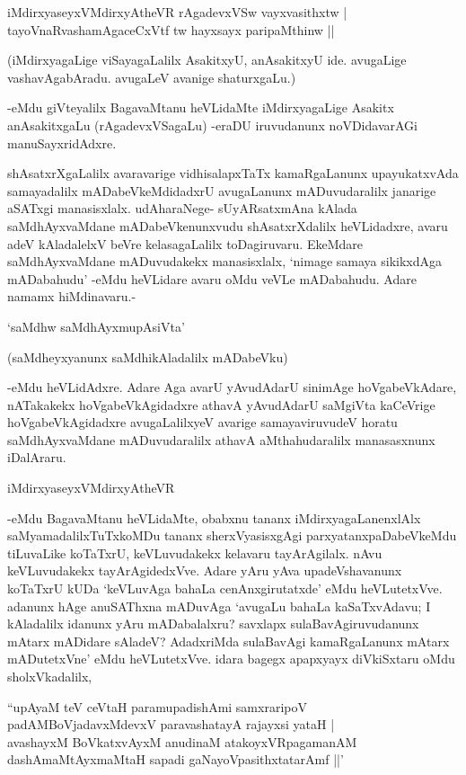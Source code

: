 \begin{shloka}
iMdirxyaseyxVMdirxyAtheVR rAgadevxVSw vayxvasithxtw |\\
tayoVnaRvashamAgaceCxVtf tw hayxsayx paripaMthinw ||
\end{shloka}

(iMdirxyagaLige viSayagaLalilx AsakitxyU, anAsakitxyU ide. avugaLige vashavAgabAradu. avugaLeV avanige shaturxgaLu.)

-eMdu giVteyalilx BagavaMtanu heVLidaMte iMdirxyagaLige Asakitx anAsakitxgaLu (rAgadevxVSagaLu) -eraDU iruvudanunx noVDidavarAGi manuSayxridAdxre.

shAsatxrXgaLalilx avaravarige vidhisalapxTaTx kamaRgaLanunx upayukatxvAda samayadalilx mADabeVkeMdidadxrU avugaLanunx mADuvudaralilx janarige aSATxgi manasisxlalx. udAharaNege- sUyARsatxmAna kAlada saMdhAyxvaMdane mADabeVkenunxvudu shAsatxrXdalilx heVLidadxre, avaru adeV kAladalelxV beVre kelasagaLalilx toDagiruvaru. EkeMdare saMdhAyxvaMdane mADuvudakekx manasisxlalx, `nimage samaya sikikxdAga mADabahudu' -eMdu heVLidare avaru oMdu veVLe mADabahudu. Adare namamx hiMdinavaru.-

\begin{shloka}
`saMdhw saMdhAyxmupAsiVta'
\end{shloka}

(saMdheyxyanunx saMdhikAladalilx mADabeVku)

-eMdu heVLidAdxre. Adare Aga avarU yAvudAdarU sinimAge hoVgabeVkAdare, nATakakekx hoVgabeVkAgidadxre athavA yAvudAdarU saMgiVta kaCeVrige hoVgabeVkAgidadxre avugaLalilxyeV avarige samayaviruvudeV horatu saMdhAyxvaMdane mADuvudaralilx athavA aMthahudaralilx manasasxnunx iDalAraru.

\begin{shloka}
iMdirxyaseyxVMdirxyAtheVR
\end{shloka}

-eMdu BagavaMtanu heVLidaMte, obabxnu tananx iMdirxyagaLanenxlAlx saMyamadalilxTuTxkoMDu tananx sherxVyasisxgAgi parxyatanxpaDabeVkeMdu tiLuvaLike koTaTxrU, keVLuvudakekx kelavaru tayArAgilalx. nAvu keVLuvudakekx tayArAgidedxVve. Adare yAru yAva upadeVshavanunx koTaTxrU kUDa `keVLuvAga bahaLa cenAnxgirutatxde' eMdu heVLutetxVve. adanunx hAge anuSAThxna mADuvAga `avugaLu bahaLa kaSaTxvAdavu; I kAladalilx idanunx yAru mADabalalxru? savxlapx sulaBavAgiruvudanunx mAtarx mADidare sAladeV? AdadxriMda sulaBavAgi kamaRgaLanunx mAtarx mADutetxVne' eMdu heVLutetxVve. idara bagegx apapxyayx diVkiSxtaru oMdu sholxVkadalilx,

\begin{shloka}
``upAyaM teV ceVtaH paramupadishAmi samxraripoV\\
padAMBoVjadavxMdevxV paravashatayA rajayxsi yataH |\\
avashayxM BoVkatxvAyxM anudinaM atakoyxVR\s pagamanAM\\
dashAmaMtAyxmaMtaH sapadi gaNayoVpasithxtatarAmf ||'
\end{shloka}

